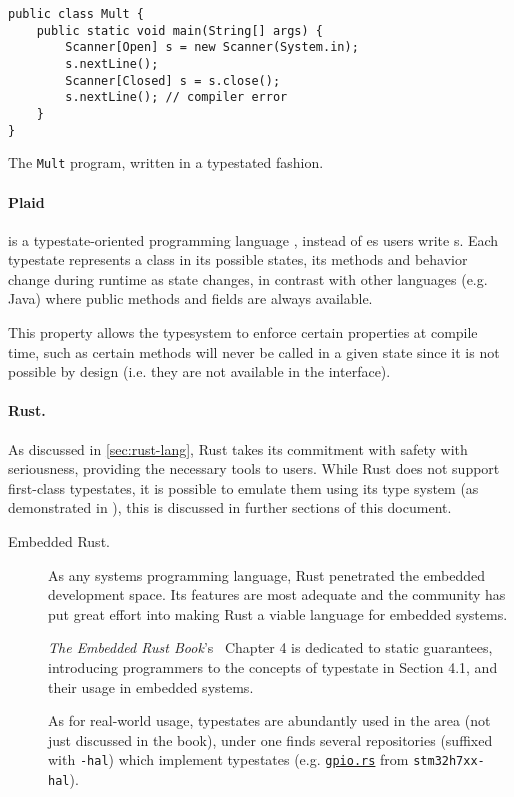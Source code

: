 \begin{listing}
    \centering
    \begin{verbatim}
public class Mult {
    public static void main(String[] args) {
        Scanner[Open] s = new Scanner(System.in);
        s.nextLine();
        Scanner[Closed] s = s.close();
        s.nextLine(); // compiler error
    }
}
    \end{verbatim}
    \caption{The \texttt{Mult} program, written in a typestated fashion.}
    \label{fig:java-mult-typestate}
\end{listing}

\paragraph{Plaid} is a typestate-oriented programming language \autocite{Aldrich2009},
instead of es users write s.
Each typestate represents a class in its possible states,
its methods and behavior change during runtime as state changes,
in contrast with other languages (e.g. Java) where public methods and fields are always available.

This property allows the typesystem to enforce certain properties at compile time,
such as certain methods will never be called in a given state since it is not possible by design
(i.e. they are not available in the interface).


\paragraph{Rust.}
As discussed in \autoref{sec:rust-lang}, Rust takes its commitment with safety with seriousness,
providing the necessary tools to users.
While Rust does not support first-class typestates,
it is possible to emulate them using its type system (as demonstrated in \autocite{Duarte2020}),
this is discussed in further sections of this document.

\begin{description}
    \item[Embedded Rust.] As any systems programming language, Rust penetrated the embedded development space.
    Its features are most adequate and the community has put great effort into making Rust a viable language for embedded systems.

    \emph{The Embedded Rust Book}'s~\autocite{Rust2021} Chapter 4 is dedicated to static guarantees,
    introducing programmers to the concepts of typestate in Section 4.1, and their usage in embedded systems.

    As for real-world usage, typestates are abundantly used in the area (not just discussed in the book),
    under \autocite{Stm32} one finds several repositories (suffixed with \texttt{-hal})
    which implement typestates
    (e.g. \href{https://github.com/stm32-rs/stm32h7xx-hal/blob/master/src/gpio.rs#L51-L128}{\texttt{gpio.rs}}
    from \texttt{stm32h7xx-hal}).
\end{description}

